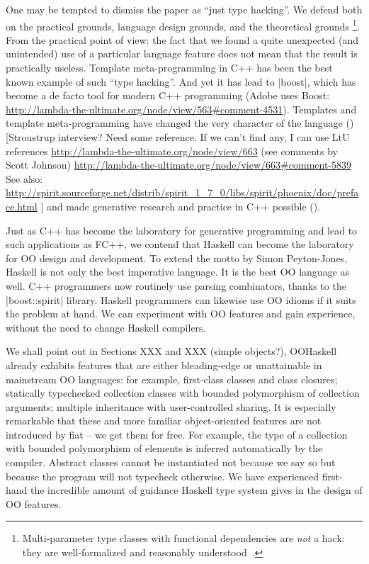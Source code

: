 One may be tempted to dismiss the paper as ``just type hacking''. We
defend both on the practical grounds, language design grounds, and the
theoretical grounds \footnote{Multi-parameter type classes with
  functional dependencies are \emph{not} a hack: they are
  well-formalized and reasonably understood~\cite{SS04}.}. From the
practical point of view: the fact that we found a quite unexpected
(and unintended) use of a particular language feature does not mean
that the result is practically useless. Template meta-programming in
C++ has been the best known example of such ``type hacking''. And yet
it has lead to |boost|, which has become a de facto tool for modern
C++ programming (Adobe uses Boost:
\url{http://lambda-the-ultimate.org/node/view/563#comment-4531}).
Templates and template meta-programming have changed the very
character of the language (\cite{fcpp-jfp})
[Stroustrup interview? Need some reference. If we
  can't find any, I can use LtU references
\url{http://lambda-the-ultimate.org/node/view/663}
(see comments by Scott Johnson)
\url{http://lambda-the-ultimate.org/node/view/663#comment-5839}
See also:
\url{http://spirit.sourceforge.net/distrib/spirit_1_7_0/libs/spirit/phoenix/doc/preface.html}
] and made generative
research and practice in C++ possible (\cite{DSL-in-three-lang}).

Just as C++ has become the laboratory for generative programming
\cite{DSL-in-three-lang} and lead to such applications as FC++, we contend
that Haskell can become the laboratory for OO design and development.
To extend the motto by Simon Peyton-Jones, Haskell is not only the
best imperative language. It is the best OO language as well.
C++ programmers now routinely use parsing combinators, thanks to the
|boost::spirit| library. Haskell programmers can likewise use OO idioms if it
suits the problem at hand. We can experiment with OO features and gain
experience, without the need to change Haskell compilers.

We shall point out in Sections XXX and XXX (simple objects?),
OOHaskell already exhibits features that are either bleading-edge or
unattainable in mainstream OO languages: for example, first-class
classes and class closures; statically typechecked collection classes
with bounded polymorphism of collection arguments; multiple
inheritance with user-controlled sharing. It is especially remarkable
that these and more familiar object-oriented features are not
introduced by fiat -- we get them for free. For example, the type of a
collection with bounded polymorphism of elements is inferred
automatically by the compiler. Abstract classes cannot be instantiated
not because we say so but because the program will not typecheck
otherwise.   We have experienced first-hand the incredible amount of
guidance Haskell type system gives in the design of OO features.

